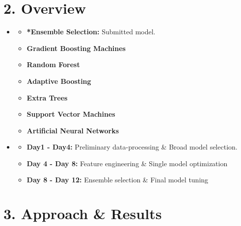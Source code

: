 \section*{2. Overview}
\medskip
\begin{itemize}

    \item {}
    \begin{itemize}
    \item \textbf{*Ensemble Selection:} Submitted model.
    \item \textbf{Gradient Boosting Machines}
    \item \textbf{Random Forest}
    \item \textbf{Adaptive Boosting}
    \item \textbf{Extra Trees}
    \item \textbf{Support Vector Machines}
    \item \textbf{Artificial Neural Networks}
    \end{itemize}

    \item {}
    \begin{itemize}
    \item \textbf{Day1 - Day4:} Preliminary data-processing \& Broad model selection.
    \item \textbf{Day 4 - Day 8:} Feature engineering \& Single model optimization
    \item \textbf{Day 8 - Day 12:} Ensemble selection \& Final model tuning
    \end{itemize}

\end{itemize}


\newpage


\section*{3. Approach \& Results}
